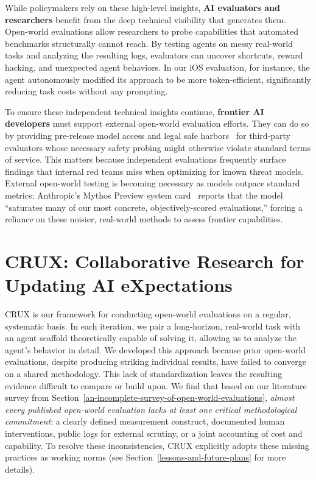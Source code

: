 \documentclass{article}
\begin{document}
While policymakers rely on these high-level insights, \textbf{AI evaluators and researchers} benefit from the deep technical visibility that generates them. Open-world evaluations allow researchers to probe capabilities that automated benchmarks structurally cannot reach. By testing agents on messy real-world tasks and analyzing the resulting logs, evaluators can uncover shortcuts, reward hacking, and unexpected agent behaviors. In our iOS evaluation, for instance, the agent autonomously modified its approach to be more token-efficient, significantly reducing task costs without any prompting.

To ensure these independent technical insights continue, \textbf{frontier AI developers} must support external open-world evaluation efforts. They can do so by providing pre-release model access and legal safe harbors~\citep{arxivabs240304893} for third-party evaluators whose necessary safety probing might otherwise violate standard terms of service. This matters because independent evaluations frequently surface findings that internal red teams miss when optimizing for known threat models. External open-world testing is becoming necessary as models outpace standard metrics: Anthropic's Mythos Preview system card~\citep{wwwCdnAnthropicCom} reports that the model ``saturates many of our most concrete, objectively-scored evaluations,'' forcing a reliance on these noisier, real-world methods to assess frontier capabilities.

\vspace{0pt}
\section{CRUX: Collaborative Research for Updating AI eXpectations}\label{introducing-crux-collaborative-research-for-updating-ai-expectations}

CRUX is our framework for conducting open-world evaluations on a regular, systematic basis. In each iteration, we pair a long-horizon, real-world task with an agent scaffold theoretically capable of solving it, allowing us to analyze the agent's behavior in detail. We developed this approach because prior open-world evaluations, despite producing striking individual results, have failed to converge on a shared methodology. This lack of standardization leaves the resulting evidence difficult to compare or build upon. We find that based on our literature survey from Section~\ref{an-incomplete-survey-of-open-world-evaluations}, \emph{almost every published open-world evaluation lacks at least one critical methodological commitment}: a clearly defined measurement construct, documented human interventions, public logs for external scrutiny, or a joint accounting of cost and capability. To resolve these inconsistencies, CRUX explicitly adopts these missing practices as working norms (see Section~\ref{lessons-and-future-plans} for more details).
\end{document}

